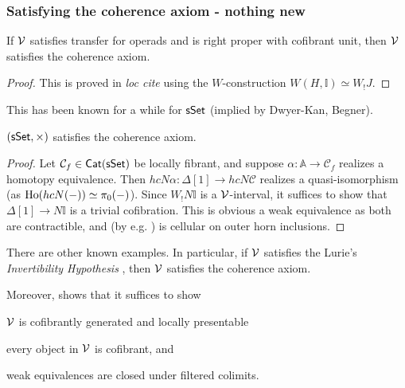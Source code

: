 \documentclass[a4paper,10pt
]{article}%
\newcommand{\I}{\mathbb I}
\renewcommand{\1}{\ensuremath{\mathbb{id}}}
\begin{document}
\subsubsection{Satisfying the coherence axiom - nothing new}
\begin{lemma}
      [{\cite[Prop 2.24]{BM13}}]
      If $\mathcal V$ satisfies transfer for operads and
      is right proper with cofibrant unit,
      then $\mathcal V$ satisfies the coherence axiom.
\end{lemma}
\begin{proof}
      This is proved in \textit{loc cite} using the $W$-construction $W(H,\I) \simeq W_!J$.
\end{proof}

This has been known for a while for $\mathsf{sSet}$ (implied by Dwyer-Kan, Begner).

\begin{proposition}
      $(\mathsf{sSet}, \times)$       %
      satisfies the coherence axiom.
\end{proposition}
\begin{proof}
      Let $\mathcal C_f \in \mathsf{Cat}(\mathsf{sSet})$ be locally fibrant, and
      suppose $\alpha: \mathbb A \to \mathcal C_f$ realizes a homotopy equivalence.
      Then $h c N \alpha: \Delta[1] \to h c N \mathcal C$ realizes a quasi-isomorphism (as $\operatorname{Ho}(h c N (-)) \simeq \pi_0(-)$).
      Since $W_!N \I$ is a $\mathcal V$-interval,
      it suffices to show that $\Delta[1] \to N \I$ is a trivial cofibration.
      This is obvious a weak equivalence as both are contractible,
      and (by e.g. \cite[Lemma 0.15]{Rie}) is cellular on outer horn inclusions.
\end{proof}

\begin{remark}
      There are other known examples.
      In particular,   
      if $\mathcal V$ satisfies the Lurie's \textit{Invertibility Hypothesis} \cite[A.3.2.12]{Lur09},
      then $\mathcal V$ satisfies the coherence axiom.

      Moreover, \cite{Law16} shows that it suffices to show
      \begin{enumerate*}
      \item $\mathcal V$ is cofibrantly generated and locally presentable
      \item every object in $\mathcal V$ is cofibrant, and
      \item weak equivalences are closed under filtered colimits.
      \end{enumerate*}
\end{remark}
\end{document}
